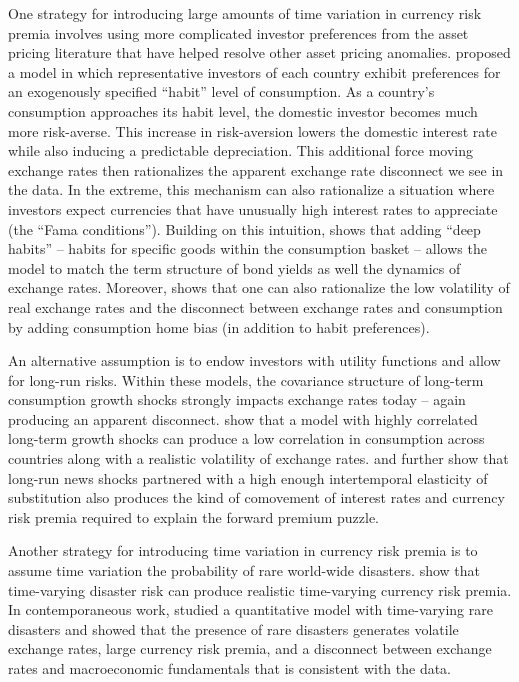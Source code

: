 \documentclass{ar-1col}
\begin{document}
One strategy for introducing large amounts of time variation in currency risk premia involves using more complicated investor preferences from the asset pricing literature that have helped resolve other asset pricing anomalies. \citet{Verdelhan2010} proposed a model in which representative investors of each country exhibit preferences for an exogenously specified ``habit'' level of consumption. As a country's consumption approaches its habit level, the domestic investor becomes much more risk-averse. This increase in risk-aversion lowers the domestic interest rate while also inducing a predictable depreciation. This additional force moving exchange rates then rationalizes the apparent exchange rate disconnect we see in the data. In the extreme, this mechanism can also rationalize a situation where investors expect currencies that have unusually high interest rates to appreciate (the ``Fama conditions'').  Building on this intuition, \citet{Heyerdahl-Larsen2011} shows that adding ``deep habits'' -- habits for specific goods within the consumption basket -- allows the model to match the term structure of bond yields as well the dynamics of exchange rates. Moreover, \citet{Stathopoulos2017} shows that one can also rationalize the low volatility of real exchange rates and the disconnect between exchange rates and consumption by adding consumption home bias (in addition to habit preferences). 

An alternative assumption is to endow investors with \cite{EpsteinZin1989} utility functions and allow for long-run risks. Within these models, the covariance structure of long-term consumption growth shocks strongly impacts exchange rates today -- again producing an apparent disconnect. \citet{ColacitoCroce2011} show that a model with highly correlated long-term growth shocks can produce a low correlation in consumption across countries along with a realistic volatility of exchange rates. \citet{BansalShaliastovich2012} and \citet{ColacitoCroce2013} further show that long-run news shocks partnered with a high enough intertemporal elasticity of substitution also produces the kind of comovement of interest rates and currency risk premia required to explain the forward premium puzzle. 

Another strategy for introducing time variation in currency risk premia is to assume time variation the probability of rare world-wide disasters. \citet{FarhiGabaix2016} show that time-varying disaster risk can produce realistic time-varying currency risk premia. In contemporaneous work, \citet{GourioSiemerVerdelhan2011} studied a quantitative model with time-varying rare disasters and showed that the presence of rare disasters generates volatile exchange rates, large currency risk premia, and a disconnect between exchange rates and macroeconomic fundamentals that is consistent with the data.
\end{document}
